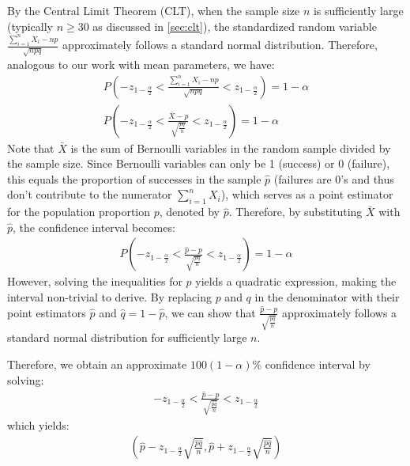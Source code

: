 By the Central Limit Theorem (CLT), when the sample size \( n \) is sufficiently large (typically \( n \geq 30 \) as discussed in \autoref{sec:clt}),
the standardized random variable \( \frac{\sum_{i = 1}^{n} X_i - np}{\sqrt{npq}} \) approximately follows a standard normal distribution.
Therefore, analogous to our work with mean parameters, we have:
\begin{gather*}
    P(-z_{1 - \frac{\alpha}{2}} < \frac{\sum_{i = 1}^{n} X_i - np}{\sqrt{npq}} < z_{1 - \frac{\alpha}{2}}) = 1 - \alpha\\
    P(-z_{1 - \frac{\alpha}{2}} < \frac{\bar{X} -  p}{\sqrt{\frac{pq}{n}}} < z_{1 - \frac{\alpha}{2}}) = 1 - \alpha
\end{gather*}
Note that \( \bar{X} \) is the sum of Bernoulli variables in the random sample divided by the sample size.
Since Bernoulli variables can only be 1 (success) or 0 (failure), this equals the proportion of successes in the sample \( \hat{p} \) (failures are 0's and thus don't contribute to the numerator \( \sum_{i = 1}^{n} X_i \)),
which serves as a point estimator for the population proportion \( p \), denoted by \( \hat{p} \).
Therefore, by substituting \( \bar{X} \) with \( \hat{p} \), the confidence interval becomes:
\begin{gather*}
    P(-z_{1 - \frac{\alpha}{2}} < \frac{\hat{p} -  p}{\sqrt{\frac{pq}{n}}} < z_{1 - \frac{\alpha}{2}}) = 1 - \alpha
\end{gather*}
However, solving the inequalities for \( p \) yields a quadratic expression, making the interval non-trivial to derive.
By replacing \( p \) and \( q \) in the denominator with their point estimators \( \hat{p} \) and \( \hat{q} = 1 - \hat{p} \),
we can show that \( \frac{\hat{p} -  p}{\sqrt{\frac{\hat{p}\hat{q}}{n}}} \) approximately follows a standard normal distribution for sufficiently large \( n \).

Therefore, we obtain an approximate \( 100(1 - \alpha)\% \) confidence interval by solving:
\begin{gather*}
    -z_{1 - \frac{\alpha}{2}} < \frac{\hat{p} -  p}{\sqrt{\frac{\hat{p}\hat{q}}{n}}} < z_{1 - \frac{\alpha}{2}}
\end{gather*}
which yields:
\begin{gather*}
    (\hat{p} - z_{1 - \frac{\alpha}{2}} \sqrt{\frac{\hat{p}\hat{q}}{n}}, \hat{p} + z_{1 - \frac{\alpha}{2}} \sqrt{\frac{\hat{p}\hat{q}}{n}} )
\end{gather*}